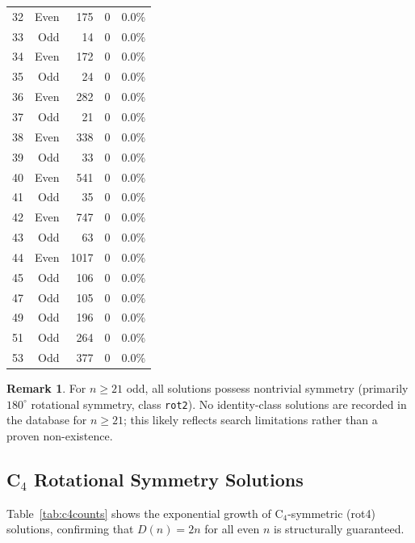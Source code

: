 \documentclass[11pt,a4paper]{article}
\theoremstyle{plain}
\theoremstyle{definition}
\newtheorem{remark}[theorem]{Remark}
\begin{document}
\begin{table}[H]
\begin{tabular}{crrrc}
32 & Even & 175 & 0 & 0.0\%\\
33 & Odd & 14 & 0 & 0.0\%\\
34 & Even & 172 & 0 & 0.0\%\\
35 & Odd & 24 & 0 & 0.0\%\\
36 & Even & 282 & 0 & 0.0\%\\
37 & Odd & 21 & 0 & 0.0\%\\
38 & Even & 338 & 0 & 0.0\%\\
39 & Odd & 33 & 0 & 0.0\%\\
40 & Even & 541 & 0 & 0.0\%\\
41 & Odd & 35 & 0 & 0.0\%\\
42 & Even & 747 & 0 & 0.0\%\\
43 & Odd & 63 & 0 & 0.0\%\\
44 & Even & 1017 & 0 & 0.0\%\\
45 & Odd & 106 & 0 & 0.0\%\\
47 & Odd & 105 & 0 & 0.0\%\\
49 & Odd & 196 & 0 & 0.0\%\\
51 & Odd & 264 & 0 & 0.0\%\\
53 & Odd & 377 & 0 & 0.0\%\\
\bottomrule
\end{tabular}
\end{table}

\begin{remark}
For $n\ge 21$ odd, all solutions possess nontrivial symmetry (primarily $180^\circ$ rotational symmetry, class \texttt{rot2}). No identity-class solutions are recorded in the database for $n\ge 21$; this likely reflects search limitations rather than a proven non-existence.
\end{remark}

\subsection{C$_4$ Rotational Symmetry Solutions}

Table~\ref{tab:c4counts} shows the exponential growth of C$_4$-symmetric (rot4) solutions, confirming that $D(n)=2n$ for all even $n$ is structurally guaranteed.
\end{document}
